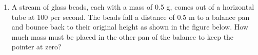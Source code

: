 \documentclass{../../../oss-apphys}
\begin{document}
\begin{enumerate}[leftmargin=15pt]
\item A stream of glass beads, each with a mass of 0.5 g, comes out of a
  horizontal tube at 100 per second. The beads fall a distance of 0.5 m to a
  balance pan and bounce back to their original height as shown in the figure
  below. How much mass must be placed in the other pan of the balance to keep
  the pointer at zero?
  \begin{center}
  \end{center}
\end{enumerate}
\end{document}
